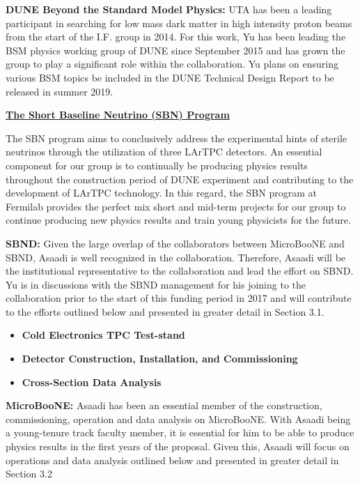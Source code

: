 \textbf{DUNE Beyond the Standard Model Physics:} UTA has been a leading participant in searching for low mass dark matter in high intensity proton beams from the start of the I.F. group in 2014. For this work, Yu has been leading the BSM physics working group of DUNE since September 2015 and has grown the group to play a significant role within the collaboration. Yu plans on ensuring various BSM topics be included in the DUNE Technical Design Report to be released in summer 2019.

\begin{center}
\underline{\textbf{The Short Baseline Neutrino (SBN) Program}}
\end{center}

\noindent The SBN program aims to conclusively address the experimental hints of sterile neutrinos through the utilization of three LArTPC detectors. An essential component for our group is to continually be producing physics results throughout the construction period of DUNE experiment and contributing to the development of LArTPC technology. In this regard, the SBN program at Fermilab provides the perfect mix short and mid-term projects for our group to continue producing new physics results and train young physicists for the future.

\textbf{SBND:} Given the large overlap of the collaborators between MicroBooNE and SBND, Asaadi is well recognized in the collaboration.  Therefore, Asaadi will be the institutional representative to the collaboration and lead the effort on SBND.  Yu is in discussions with the SBND management for his joining to the collaboration prior to the start of this funding period in 2017 and will contribute to the efforts outlined below and presented in greater detail in Section 3.1. 

\begin{itemize}
\item{\textbf{Cold Electronics TPC Test-stand}}

\item{\textbf{Detector Construction, Installation, and Commissioning}}

\item{\textbf{Cross-Section Data Analysis}}

\end{itemize}


\textbf{MicroBooNE:} Asaadi has been an essential member of the construction, commissioning, operation and data analysis on MicroBooNE. With Asaadi being a young-tenure track faculty member, it is essential for him to be able to produce physics results in the first years of the proposal. Given this, Asaadi will focus on operations and data analysis outlined below and presented in greater detail in Section 3.2

